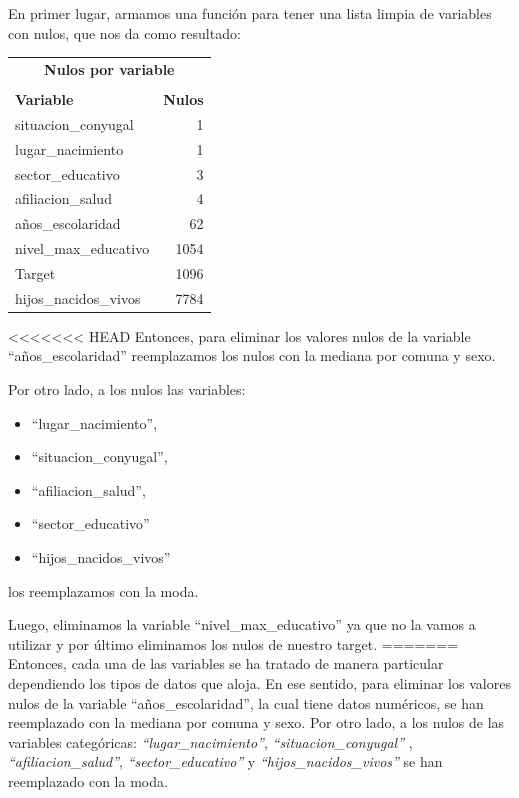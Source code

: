 \documentclass[a4paper]{article}
\begin{document}
        En primer lugar, armamos una función para tener una lista limpia de variables con nulos, que nos da como resultado:

        \begin{table}[H]
            \centering
            \begin{tabular}{lr}
                \multicolumn{2}{c}{\textbf{\large Nulos por variable}} \\
                 & \\
                \toprule
                \textbf{Variable} & \textbf{Nulos} \\ \midrule
                situacion\_conyugal & 1 \\ 
                lugar\_nacimiento & 1 \\ 
                sector\_educativo & 3 \\ 
                afiliacion\_salud & 4 \\ 
                años\_escolaridad & 62 \\ 
                nivel\_max\_educativo & 1054 \\ 
                Target & 1096 \\ 
                hijos\_nacidos\_vivos & 7784 \\ 
                \bottomrule
            \end{tabular}
        \end{table}

<<<<<<< HEAD
        Entonces, para eliminar los valores nulos de la variable ``años\_escolaridad'' reemplazamos los nulos con la mediana por comuna y sexo.

        Por otro lado, a los nulos las variables:
        \begin{itemize}
            \item ``lugar\_nacimiento'',
            \item ``situacion\_conyugal'',
            \item ``afiliacion\_salud'',
            \item ``sector\_educativo''
            \item ``hijos\_nacidos\_vivos''
        \end{itemize}
        los reemplazamos con la moda.
        
        Luego, eliminamos la variable ``nivel\_max\_educativo'' ya que no la vamos a utilizar y por último eliminamos los nulos de nuestro target. 
=======
        Entonces, cada una de las variables se ha tratado de manera particular dependiendo los tipos de datos que aloja. En ese sentido, para eliminar los valores nulos de la variable ``años\_escolaridad'', la cual tiene datos numéricos, se han reemplazado con la mediana por comuna y sexo. Por otro lado, a los nulos de las variables categóricas: \textit{``lugar\_nacimiento''}, \textit{``situacion\_conyugal''}
        , \textit{``afiliacion\_salud''}, \textit{``sector\_educativo''} y \textit{``hijos\_nacidos\_vivos''}
        se han reemplazado con la moda.
 
\end{document}
